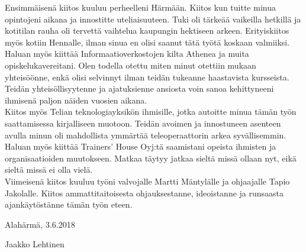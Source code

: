 \documentclass[finnish,12pt,a4paper,pdftex]{article}
\begin{document}
\noindent Ensimmäisenä kiitos kuuluu perheelleni Härmään. Kiitos kun tuitte minua opintojeni aikana ja innostitte uteliaisuuteen. Tuki oli tärkeää vaikeilla hetkillä ja kotitilan rauha oli tervettä vaihtelua kaupungin hektiseen arkeen. Erityiskiitos myös kotiin Hennalle, ilman sinua en olisi saanut tätä työtä koskaan valmiiksi. \\

\noindent Haluan myös kiittää Informaatioverkostojen kilta Athenea ja muita opiskelukavereitani. Olen todella otettu miten minut otettiin mukaan yhteisöönne, enkä olisi selvinnyt ilman teidän tukeanne haastavista kursseista. Teidän yhteisöllisyytenne ja ajatuksienne ansiosta voin sanoa kehittyneeni ihmisenä paljon näiden vuosien aikana. \\

\noindent Kiitos myös Telian teknologiayksikön ihmisille, jotka autoitte minua tämän työn saattamisessa kirjalliseen muotoon. Teidän avoimen ja innostuneen asenteen avulla minun oli mahdollista ymmärtää teleoperaattorin arkea syvällisemmin. Haluan myös kiittää Trainers' House Oyj:tä saamistani opeista ihmisten ja organisaatioiden muutokseen. Matkaa täytyy jatkaa sieltä missä ollaan nyt, eikä sieltä missä ei olla vielä. \\

\noindent Viimeisenä kiitos kuuluu työni valvojalle Martti Mäntylälle ja ohjaajalle Tapio Jakolalle. Kiitos ammattitaitoisesta ohjauksestanne, ideoistanne ja runsaasta ajankäytöstänne tämän työn eteen.

\vspace{5cm}
Alahärmä, 3.6.2018

\vspace{5mm}
{\hfill Jaakko Lehtinen \hspace{1cm}}

\newpage


\thesistableofcontents
\end{document}
